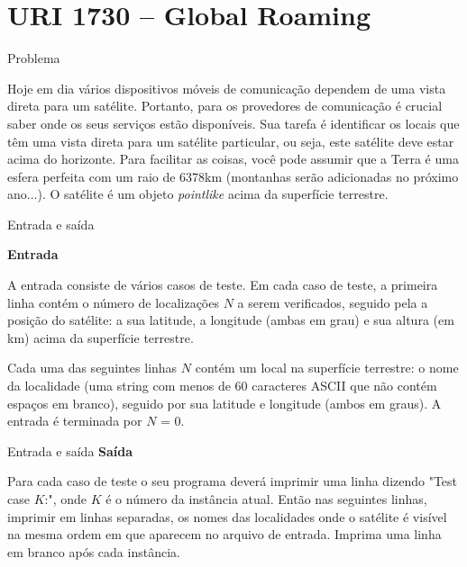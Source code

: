 \section{URI 1730 -- Global Roaming}

\begin{frame}[fragile]{Problema}

Hoje em dia vários dispositivos móveis de comunicação dependem de uma vista direta para um satélite. Portanto, para os provedores de comunicação é crucial saber onde os seus serviços estão disponíveis. Sua tarefa é identificar os locais que têm uma vista direta para um satélite particular, ou seja, este satélite deve estar acima do horizonte. Para facilitar as coisas, você pode assumir que a Terra é uma esfera perfeita com um raio de 6378km (montanhas serão adicionadas no próximo ano...). O satélite é um objeto \textit{pointlike} acima da superfície terrestre.

\end{frame}

\begin{frame}[fragile]{Entrada e saída}

\textbf{Entrada}

A entrada consiste de vários casos de teste. Em cada caso de teste, a primeira linha contém o número de localizações $N$ a serem verificados, seguido pela a posição do satélite: a sua latitude, a longitude (ambas em grau) e sua altura (em km) acima da superfície terrestre.

Cada uma das seguintes linhas $N$ contém um local na superfície terrestre: o nome da localidade (uma string com menos de 60 caracteres ASCII que não contém espaços em branco), seguido por sua latitude e longitude (ambos em graus). A entrada é terminada por $N$ = 0.

\end{frame}

\begin{frame}[fragile]{Entrada e saída}
\textbf{Saída}

Para cada caso de teste o seu programa deverá imprimir uma linha dizendo "Test case $K$:", onde $K$ é o número da instância atual. Então nas seguintes linhas, imprimir em linhas separadas, os nomes das localidades onde o satélite é visível na mesma ordem em que aparecem no arquivo de entrada. Imprima uma linha em branco após cada instância.

\end{frame}

